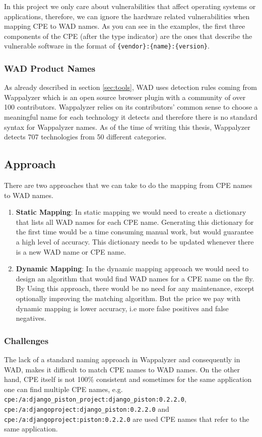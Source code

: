In this project we only care about vulnerabilities that affect operating systems or applications, therefore, we can ignore the hardware related vulnerabilities when mapping CPE to WAD names. As you can see in the examples, the first three components of the CPE (after the type indicator) are the ones that describe the vulnerable software in the format of \texttt{\{vendor\}:\{name\}:\{version\}}.
 

\subsubsection{WAD Product Names}
As already described in section \ref{sec:tools}, WAD uses detection rules coming from Wappalyzer which is an open source browser plugin with a community of over 100 contributors. Wappalyzer relies on its contributors' common sense to choose a meaningful name for each technology it detects and therefore there is no standard syntax for Wappalyzer names. As of the time of writing this thesis, Wappalyzer detects 707 technologies from 50 different categories.


\subsection{Approach}

There are two approaches that we can take to do the mapping from CPE names to WAD names.
\begin{enumerate}
\item \textbf{Static Mapping}: In static mapping we would need to create a dictionary that lists all WAD names for each CPE name. Generating this dictionary for the first time would be a time consuming manual work, but would guarantee a high level of accuracy. This dictionary needs to be updated whenever there is a new WAD name or CPE name. 
\item \textbf{Dynamic Mapping}: In the dynamic mapping approach we would need to design an algorithm that would find WAD names for a CPE name on the fly. By Using this approach, there would be no need for any maintenance, except optionally improving the matching algorithm. But the price we pay with dynamic mapping is lower accuracy, i.e more false positives and false negatives.  
\end{enumerate} 



\subsubsection{Challenges}
The lack of a standard naming approach in Wappalyzer and consequently in WAD, makes it difficult to match CPE names to WAD names. On the other hand, CPE itself is not 100\% consistent and sometimes for the same application one can find multiple CPE names, e.g. \texttt{cpe:/a:django\_piston\_project:django\_piston:0.2.2.0}, \texttt{cpe:/a:djangoproject:django\_piston:0.2.2.0} and \texttt{cpe:/a:djangoproject:piston:0.2.2.0} are used CPE names that refer to the same application.

